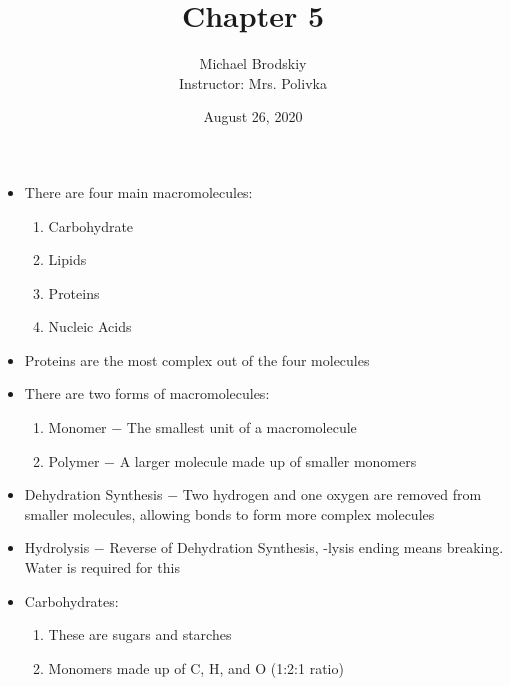 \documentclass[12pt]{article}
\title{Chapter 5}
\date{August 26, 2020}
\author{Michael Brodskiy\\ \small Instructor: Mrs. Polivka}
\begin{document}
\maketitle

\begin{itemize}

  \item There are four main macromolecules:
    
    \begin{enumerate}

      \item Carbohydrate

      \item Lipids
        
      \item Proteins

      \item Nucleic Acids

    \end{enumerate}

  \item Proteins are the most complex out of the four molecules

  \item There are two forms of macromolecules:

    \begin{enumerate}

      \item Monomer $-$ The smallest unit of a macromolecule

      \item Polymer $-$ A larger molecule made up of smaller monomers

    \end{enumerate}

  \item Dehydration Synthesis $-$ Two hydrogen and one oxygen are removed from smaller molecules, allowing bonds to form more complex molecules

  \item Hydrolysis $-$ Reverse of Dehydration Synthesis, -lysis ending means breaking. Water is required for this

  \item Carbohydrates:

    \begin{enumerate}

      \item These are sugars and starches

      \item Monomers made up of C, H, and O (1:2:1 ratio)


\end{enumerate}
\end{itemize}
\end{document}
